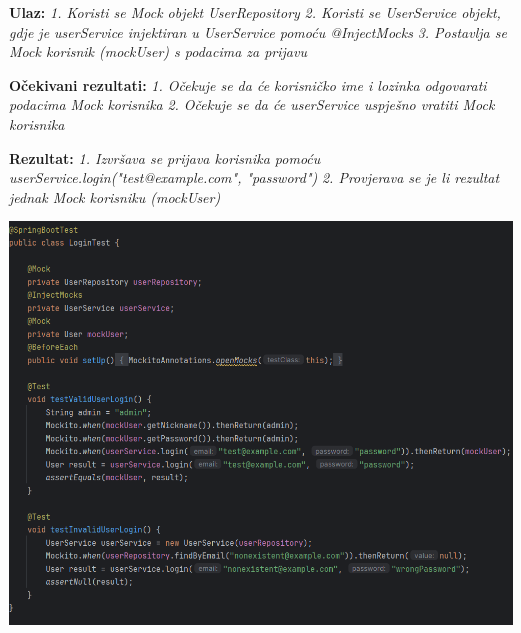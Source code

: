                                                                                                 \textbf{Ulaz:}
                                                                                                \textit{1. Koristi se Mock objekt UserRepository}
                                                                                                \textit{2. Koristi se UserService objekt, gdje je userService injektiran u UserService pomoću @InjectMocks}
                                                                                                \textit{3. Postavlja se Mock korisnik (mockUser) s podacima za prijavu}


                                                                                                \textbf{Očekivani rezultati:}
                                                                                                \textit{1. Očekuje se da će korisničko ime i lozinka odgovarati podacima Mock korisnika}
                                                                                                \textit{2. Očekuje se da će userService uspješno vratiti Mock korisnika}


                                                                                                \textbf{Rezultat:}
                                                                                                \textit{1. Izvršava se prijava korisnika pomoću userService.login("test@example.com", "password")}
                                                                                                \textit{2. Provjerava se je li rezultat jednak Mock korisniku (mockUser)}

                        \includegraphics[width=1\linewidth]{slike/LoginTest.png}



